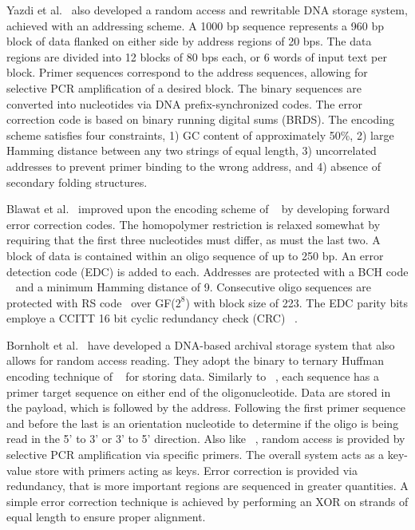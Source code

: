 \documentclass{bioinfo}
\begin{document}
Yazdi et al.~\cite{YAZDI2015} also developed a random access and rewritable DNA storage system, achieved with an addressing scheme. A 1000 bp sequence represents a 960 bp block of data flanked on either side by address regions of 20 bps. The data regions are divided into 12 blocks of 80 bps each, or 6 words of input text per block. Primer sequences correspond to the address sequences, allowing for selective PCR amplification of a desired block. The binary sequences are converted into nucleotides via DNA prefix-synchronized codes. The error correction code is based on binary running digital sums (BRDS). The encoding scheme satisfies four constraints, 1) GC content of approximately 50\%, 2) large Hamming distance between any two strings of equal length, 3) uncorrelated addresses to prevent primer binding to the wrong address, and 4) absence of secondary folding structures.

Blawat et al.~\cite{BLAWAT2016} improved upon the encoding scheme of ~\cite{CHURCH2012} by developing forward error correction codes. The homopolymer restriction is relaxed somewhat by requiring that the first three nucleotides must differ, as must the last two. A block of data is contained within an oligo sequence of up to 250 bp. An error detection code (EDC) is added to each. Addresses are protected with a BCH code ~\cite{BOSE1960} and a minimum Hamming distance of 9. Consecutive oligo sequences are protected with RS code~\cite{REED1960} over GF($2^8$) with block size of 223. The EDC parity bits employe a CCITT 16 bit cyclic redundancy check (CRC) ~\cite{LIN2004}.

Bornholt et al.~\cite{BORNHOLT2016} have developed a DNA-based archival storage system that also allows for random access reading. They adopt the binary to ternary Huffman encoding technique of ~\cite{GOLDMAN2013} for storing data. Similarly to ~\cite{YAZDI2015}, each sequence has a primer target sequence on either end of the oligonucleotide. Data are stored in the payload, which is followed by the address. Following the first primer sequence and before the last is an orientation nucleotide to determine if the oligo is being read in the 5' to 3' or 3' to 5' direction. Also like ~\cite{YAZDI2015}, random access is provided by selective PCR amplification via specific primers. The overall system acts as a key-value store with primers acting as keys. Error correction is provided via redundancy, that is more important regions are sequenced in greater quantities. A simple error correction technique is achieved by performing an XOR on strands of equal length to ensure proper alignment.
\end{document}
